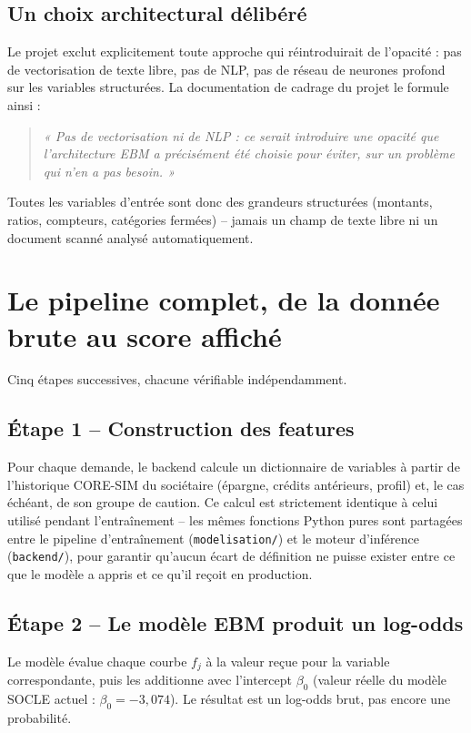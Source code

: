 \documentclass[11pt,a4paper]{article}
\begin{document}
\subsection{Un choix architectural délibéré}

Le projet exclut explicitement toute approche qui réintroduirait de l'opacité : pas de
vectorisation de texte libre, pas de NLP, pas de réseau de neurones profond sur les variables
structurées. La documentation de cadrage du projet le formule ainsi :

\begin{quote}\itshape
« Pas de vectorisation ni de NLP : ce serait introduire une opacité que l'architecture EBM a
précisément été choisie pour éviter, sur un problème qui n'en a pas besoin. »
\end{quote}

Toutes les variables d'entrée sont donc des grandeurs structurées (montants, ratios, compteurs,
catégories fermées) -- jamais un champ de texte libre ni un document scanné analysé
automatiquement.

\section{Le pipeline complet, de la donnée brute au score affiché}

Cinq étapes successives, chacune vérifiable indépendamment.

\subsection{Étape 1 -- Construction des features}

Pour chaque demande, le backend calcule un dictionnaire de variables à partir de l'historique
CORE-SIM du sociétaire (épargne, crédits antérieurs, profil) et, le cas échéant, de son groupe de
caution. Ce calcul est strictement identique à celui utilisé pendant l'entraînement -- les mêmes
fonctions Python pures sont partagées entre le pipeline d'entraînement (\texttt{modelisation/}) et
le moteur d'inférence (\texttt{backend/}), pour garantir qu'aucun écart de définition ne puisse
exister entre ce que le modèle a appris et ce qu'il reçoit en production.

\subsection{Étape 2 -- Le modèle EBM produit un log-odds}

Le modèle évalue chaque courbe $f_j$ à la valeur reçue pour la variable correspondante, puis les
additionne avec l'intercept $\beta_0$ (valeur réelle du modèle SOCLE actuel : $\beta_0 = -3{,}074$).
Le résultat est un log-odds brut, pas encore une probabilité.
\end{document}
